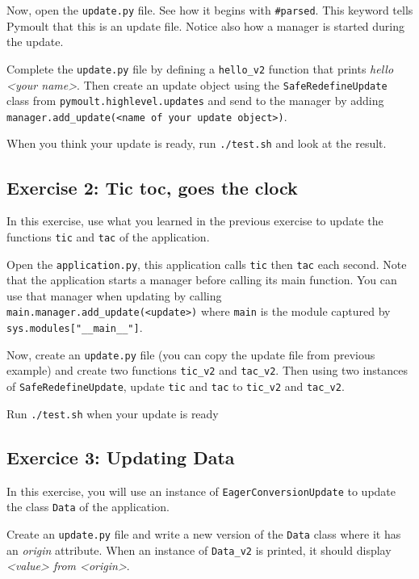 \documentclass{article}
\begin{document}
Now, open the \texttt{update.py} file. See how it begins with
\texttt{\#parsed}. This keyword tells Pymoult that this is an update
file. Notice also how a manager is started during the update.  

Complete the \texttt{update.py} file by defining a
\texttt{hello\_v2} function that prints \textit{hello <your
  name>}. Then create an update object using the
\texttt{SafeRedefineUpdate} class from
\texttt{pymoult.highlevel.updates} and send to the manager by adding
\texttt{manager.add\_update(<name of your update object>)}. 

When you think your update is ready, run \texttt{./test.sh} and look
at the result.


\subsection{Exercise 2: Tic toc, goes the clock}

In this exercise, use what you learned in the previous exercise to
update the functions \texttt{tic} and \texttt{tac} of the
application.

Open the \texttt{application.py}, this application calls
\texttt{tic} then \texttt{tac} each second. Note that the
application starts a manager before calling its main function. You can
use that manager when updating by calling \\
\texttt{main.manager.add\_update(<update>)} where \texttt{main}
is the module captured by \texttt{sys.modules["\_\_main\_\_"]}.

Now, create an \texttt{update.py} file (you can copy the update file
from previous example) and create two functions \texttt{tic\_v2} and
\texttt{tac\_v2}. Then using two instances of
\texttt{SafeRedefineUpdate}, update \texttt{tic} and
\texttt{tac} to \texttt{tic\_v2} and \texttt{tac\_v2}.

Run \texttt{./test.sh} when your update is ready

\subsection{Exercice 3: Updating Data}

In this exercise, you will use an instance of
\texttt{EagerConversionUpdate} to update the class \texttt{Data} of
the application.

Create an \texttt{update.py} file and write a new version of the
\texttt{Data} class where it has an \textit{origin} attribute. When an
instance of \texttt{Data\_v2} is printed, it should display
\textit{<value> from <origin>}.
\end{document}
